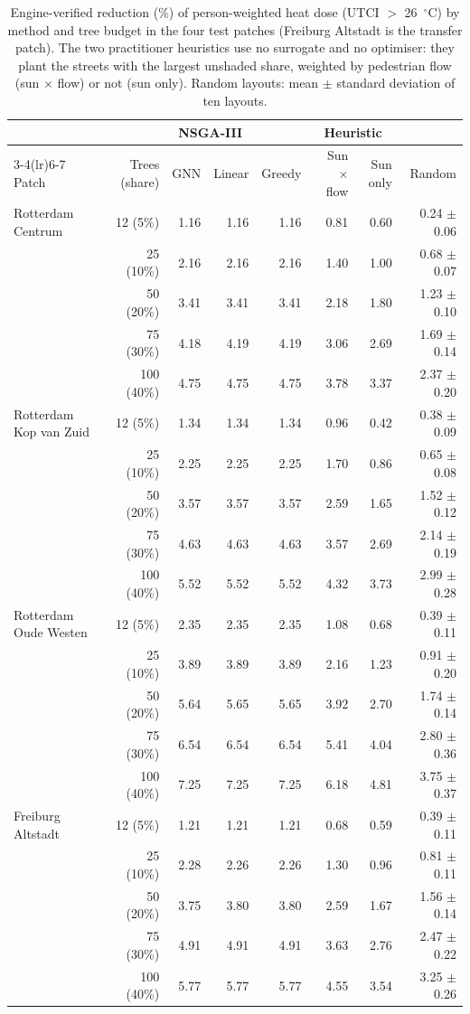 \begin{table}[tbp]
\centering
\footnotesize
\setlength{\tabcolsep}{3pt}
\caption{Engine-verified reduction (\%) of person-weighted heat dose (UTCI $>$ 26~$^\circ$C) by method and tree budget in the four test patches (Freiburg Altstadt is the transfer patch). The two practitioner heuristics use no surrogate and no optimiser: they plant the streets with the largest unshaded share, weighted by pedestrian flow (sun $\times$ flow) or not (sun only). Random layouts: mean $\pm$ standard deviation of ten layouts.}
\label{tab:T4_benchmark}
\begin{tabular}{lrrrrrrr}
\toprule
 & & \multicolumn{2}{c}{NSGA-III} & & \multicolumn{2}{c}{Heuristic} & \\
\cmidrule(lr){3-4}\cmidrule(lr){6-7}
Patch & Trees (share) & GNN & Linear & Greedy & Sun $\times$ flow & Sun only & Random \\
\midrule
Rotterdam Centrum & 12 (5\%) & 1.16 & 1.16 & 1.16 & 0.81 & 0.60 & 0.24 $\pm$ 0.06 \\
 & 25 (10\%) & 2.16 & 2.16 & 2.16 & 1.40 & 1.00 & 0.68 $\pm$ 0.07 \\
 & 50 (20\%) & 3.41 & 3.41 & 3.41 & 2.18 & 1.80 & 1.23 $\pm$ 0.10 \\
 & 75 (30\%) & 4.18 & 4.19 & 4.19 & 3.06 & 2.69 & 1.69 $\pm$ 0.14 \\
 & 100 (40\%) & 4.75 & 4.75 & 4.75 & 3.78 & 3.37 & 2.37 $\pm$ 0.20 \\
\addlinespace
Rotterdam Kop van Zuid & 12 (5\%) & 1.34 & 1.34 & 1.34 & 0.96 & 0.42 & 0.38 $\pm$ 0.09 \\
 & 25 (10\%) & 2.25 & 2.25 & 2.25 & 1.70 & 0.86 & 0.65 $\pm$ 0.08 \\
 & 50 (20\%) & 3.57 & 3.57 & 3.57 & 2.59 & 1.65 & 1.52 $\pm$ 0.12 \\
 & 75 (30\%) & 4.63 & 4.63 & 4.63 & 3.57 & 2.69 & 2.14 $\pm$ 0.19 \\
 & 100 (40\%) & 5.52 & 5.52 & 5.52 & 4.32 & 3.73 & 2.99 $\pm$ 0.28 \\
\addlinespace
Rotterdam Oude Westen & 12 (5\%) & 2.35 & 2.35 & 2.35 & 1.08 & 0.68 & 0.39 $\pm$ 0.11 \\
 & 25 (10\%) & 3.89 & 3.89 & 3.89 & 2.16 & 1.23 & 0.91 $\pm$ 0.20 \\
 & 50 (20\%) & 5.64 & 5.65 & 5.65 & 3.92 & 2.70 & 1.74 $\pm$ 0.14 \\
 & 75 (30\%) & 6.54 & 6.54 & 6.54 & 5.41 & 4.04 & 2.80 $\pm$ 0.36 \\
 & 100 (40\%) & 7.25 & 7.25 & 7.25 & 6.18 & 4.81 & 3.75 $\pm$ 0.37 \\
\addlinespace
Freiburg Altstadt & 12 (5\%) & 1.21 & 1.21 & 1.21 & 0.68 & 0.59 & 0.39 $\pm$ 0.11 \\
 & 25 (10\%) & 2.28 & 2.26 & 2.26 & 1.30 & 0.96 & 0.81 $\pm$ 0.11 \\
 & 50 (20\%) & 3.75 & 3.80 & 3.80 & 2.59 & 1.67 & 1.56 $\pm$ 0.14 \\
 & 75 (30\%) & 4.91 & 4.91 & 4.91 & 3.63 & 2.76 & 2.47 $\pm$ 0.22 \\
 & 100 (40\%) & 5.77 & 5.77 & 5.77 & 4.55 & 3.54 & 3.25 $\pm$ 0.26 \\
\bottomrule
\end{tabular}
\end{table}
